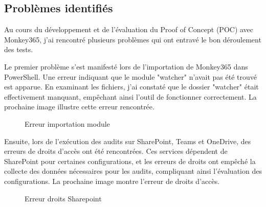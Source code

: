\subsection{Problèmes identifiés}

Au cours du développement et de l'évaluation du Proof of Concept (POC) avec Monkey365, j'ai rencontré plusieurs problèmes qui ont entravé le bon déroulement des tests.

Le premier problème s'est manifesté lors de l'importation de Monkey365 dans PowerShell. Une erreur indiquant que le module "watcher" n'avait pas été trouvé est apparue. En examinant les fichiers, j'ai constaté que le dossier "watcher" était effectivement manquant, empêchant ainsi l'outil de fonctionner correctement. La prochaine image illustre cette erreur rencontrée.

\begin{figure}[H]
    \begin{center}
        \caption{Erreur importation module}
    \end{center}
\end{figure}

Ensuite, lors de l'exécution des audits sur SharePoint, Teams et OneDrive, des erreurs de droits d'accès ont été rencontrées. Ces services dépendent de SharePoint pour certaines configurations, et les erreurs de droits ont empêché la collecte des données nécessaires pour les audits, compliquant ainsi l'évaluation des configurations. La prochaine image montre l'erreur de droits d'accès.

\begin{figure}[H]
    \begin{center}
        \caption{Erreur droits Sharepoint}
    \end{center}
\end{figure}

